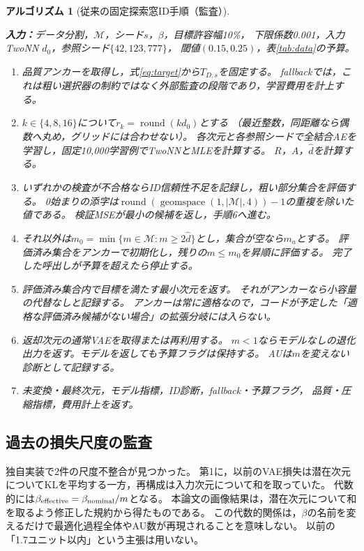 \documentclass[11pt,a4paper]{ltjsarticle}
\newtheorem{Algorithm}{アルゴリズム}
\begin{document}
\noindent\begin{minipage}{\linewidth}
\begin{Algorithm}[従来の固定探索窓ID手順（監査）]
\label{alg:legacy}\normalfont\small\leavevmode\par\noindent
\textbf{入力：}データ分割，$\mathcal M$，シード$s$，$\beta$，目標許容幅10\%，
下限係数0.001，入力TwoNN $d_0$，参照シード$\{42,123,777\}$，
閾値$(0.15,0.25)$，表\ref{tab:data}の予算。
\begin{enumerate}
\item 品質アンカーを取得し，式\eqref{eq:target}から$T_{D,s}$を固定する。
fallbackでは，これは粗い選択器の制約ではなく外部監査の段階であり，学習費用を計上する。
\item $k\in\{4,8,16\}$について$r_k=\operatorname{round}(kd_0)$とする
（最近整数，同距離なら偶数へ丸め，グリッドには合わせない）。
各次元と各参照シードで全結合AEを学習し，固定10,000学習例でTwoNNとMLEを計算する。
$R$，$A$，$\hat d$を計算する。
\item いずれかの検査が不合格ならID信頼性不足を記録し，粗い部分集合を評価する。
0始まりの添字は$\operatorname{round}(\operatorname{geomspace}(1,|\mathcal M|,4))-1$の重複を除いた値である。
検証MSEが最小の候補を返し，手順6へ進む。
\item それ以外は$m_0=\min\{m\in\mathcal M:m\ge2\hat d\}$とし，集合が空なら$m_a$とする。
評価済み集合をアンカーで初期化し，残りの$m\le m_0$を昇順に評価する。
完了した呼出しが予算を超えたら停止する。
\item 評価済み集合内で目標を満たす最小次元を返す。
それがアンカーなら小容量の代替なしと記録する。
アンカーは常に適格なので，コードが予定した「適格な評価済み候補が\emph{ない}場合」の拡張分岐には入らない。
\item 返却次元の通常VAEを取得または再利用する。
$m<1$ならモデルなしの退化出力を返す。モデルを返しても予算フラグは保持する。
AUは$m$を変えない診断として記録する。
\item 未変換・最終次元，モデル指標，ID診断，fallback・予算フラグ，
品質・圧縮指標，費用計上を返す。
\end{enumerate}
\end{Algorithm}
\end{minipage}

\subsection{過去の損失尺度の監査}\label{app:scaling}
独自実装で2件の尺度不整合が見つかった。
第1に，以前のVAE損失は潜在次元についてKLを平均する一方，再構成は入力次元について和を取っていた。
代数的には$\beta_{\rm effective}=\beta_{\rm nominal}/m$となる。
本論文の画像結果は，潜在次元について和を取るよう修正した規約から得たものである。
この代数的関係は，$\beta$の名前を変えるだけで最適化過程全体やAU数が再現されることを意味しない。
以前の「1.7ユニット以内」という主張は用いない。
\end{document}
